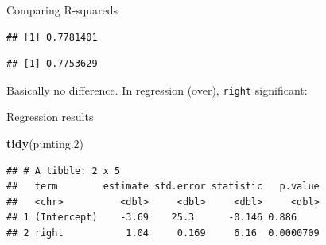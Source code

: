 \documentclass[ignorenonframetext,]{beamer}
\newenvironment{Shaded}{\begin{snugshade}}{\end{snugshade}}
\newcommand{\FloatTok}[1]{\textcolor[rgb]{0.00,0.00,0.81}{#1}}
\newcommand{\KeywordTok}[1]{\textcolor[rgb]{0.13,0.29,0.53}{\textbf{#1}}}
\newcommand{\NormalTok}[1]{#1}
\newcommand{\OperatorTok}[1]{\textcolor[rgb]{0.81,0.36,0.00}{\textbf{#1}}}
\begin{document}
\begin{frame}[fragile]{Comparing R-squareds}
\protect\hypertarget{comparing-r-squareds}{}

\begin{Shaded}
\end{Shaded}

\begin{verbatim}
## [1] 0.7781401
\end{verbatim}

\begin{Shaded}
\end{Shaded}

\begin{verbatim}
## [1] 0.7753629
\end{verbatim}

Basically no difference. In regression (over), \texttt{right}
significant:

\end{frame}

\begin{frame}[fragile]{Regression results}
\protect\hypertarget{regression-results}{}

\begin{Shaded}
\begin{Highlighting}[]
\KeywordTok{tidy}\NormalTok{(punting}\FloatTok{.2}\NormalTok{)}
\end{Highlighting}
\end{Shaded}

\begin{verbatim}
## # A tibble: 2 x 5
##   term        estimate std.error statistic   p.value
##   <chr>          <dbl>     <dbl>     <dbl>     <dbl>
## 1 (Intercept)    -3.69    25.3      -0.146 0.886    
## 2 right           1.04     0.169     6.16  0.0000709
\end{verbatim}

\end{frame}
\end{document}
